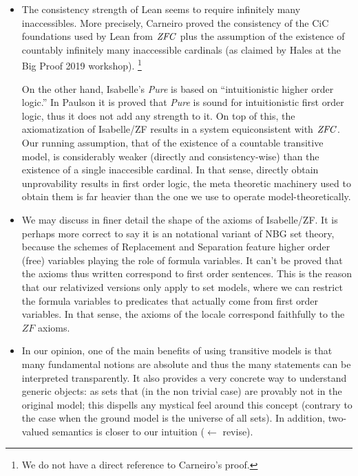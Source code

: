 \begin{itemize}
\item The consistency strength of Lean seems to require infinitely
  many inaccessibles. More precisely, Carneiro proved the  consistency
  of the CiC foundations used by Lean from $\mathit{ZFC}$ plus the assumption
  of the existence of countably infinitely many inaccessible cardinals
  (as claimed by Hales \cite{hales-math-defs-formally} at the Big
  Proof 2019 workshop).%
  \footnote{We do not have a direct reference to Carneiro's proof.}

  On the other hand, Isabelle's \emph{Pure} is based on
  ``intuitionistic higher order logic.'' In Paulson
  \cite{Paulson1989} it is proved that \emph{Pure} is sound for
  intuitionistic first order logic, thus it does not add any strength
  to it. On top of this, the axiomatization of Isabelle/ZF results in
  a system equiconsistent with $\mathit{ZFC}$. Our running assumption, that of
  the existence of a countable transitive model, is considerably
  weaker (directly and consistency-wise) than the existence of a
  single inaccesible cardinal. In that sense, directly obtain
  unprovability results in first order logic, the meta theoretic
  machinery used to obtain them is far heavier than the one we use to
  operate model-theoretically.
\item We may discuss in finer detail the shape of the axioms of
  Isabelle/ZF. It is perhaps more correct to say it is an
  notational variant of NBG set theory, because the schemes of
  Replacement and Separation feature higher order (free) variables
  playing the role of formula variables. It can't be proved that the
  axioms thus written correspond to first order sentences. This is the
  reason that our relativized versions only apply to set models, where
  we can restrict the formula variables to predicates that actually
  come from first order variables. In that sense, the axioms of the
  locale  correspond faithfully to the
  $ZF$ axioms.
\item {} In our opinion, one of the
  main benefits of using transitive models is that many fundamental
  notions are absolute and thus the many statements can be interpreted
  transparently. It also provides a very concrete way to understand
  generic objects: as sets that (in the non trivial case) are provably
  not in the original model; this dispells any mystical feel around
  this concept (contrary to the case when the ground model is the
  universe of all sets). In addition, two-valued semantics is
  closer to our intuition ($\leftarrow$ revise).
\end{itemize}
